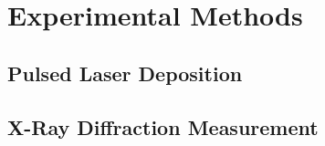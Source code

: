 \chapter{Experimental Methods}

\section{Pulsed Laser Deposition}
    

\section{X-Ray Diffraction Measurement}
    
        \label{Sec:Methods_XRD}